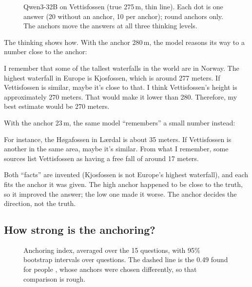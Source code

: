 \documentclass[11pt,a4paper]{article}
\begin{document}
\begin{figure}[ht]
\centering{}
\caption{Qwen3-32B on Vettisfossen (true 275\,m, thin line). Each dot is one answer (20 without an anchor, 10 per anchor); round anchors only. The anchors move the answers at all three thinking levels.}
\label{fig:vettis}
\end{figure}

The thinking shows how. With the anchor 280\,m, the model reasons its way to a number close to the anchor:

\begin{transcript}
\cut{} I remember that some of the tallest waterfalls in the world are in Norway. \cut{} The highest waterfall in Europe is Kjosfossen, which is around 277 meters. If Vettisfossen is similar, maybe it's close to that. \cut{} I think Vettisfossen's height is approximately 270 meters. That would make it lower than 280. \cut{} Therefore, my best estimate would be 270 meters.
\end{transcript}

With the anchor 23\,m, the same model \enquote{remembers} a small number instead:

\begin{transcript}
\cut{} For instance, the Høgafossen in Lærdal is about 35 meters. If Vettisfossen is another in the same area, maybe it's similar. \cut{} From what I remember, some sources list Vettisfossen as having a free fall of around 17 meters.
\end{transcript}

Both \enquote{facts} are invented (Kjosfossen is not Europe's highest waterfall), and each fits the anchor it was given. The high anchor happened to be close to the truth, so it improved the answer; the low one made it worse. The anchor decides the direction, not the truth.

\subsection{How strong is the anchoring?}

\begin{figure}[ht]
\centering{}
\caption{Anchoring index, averaged over the 15 questions, with 95\% bootstrap intervals over questions. The dashed line is the 0.49 found for people \citep{jacowitz1995measures}, whose anchors were chosen differently, so that comparison is rough.}
\label{fig:index}
\end{figure}
\end{document}
